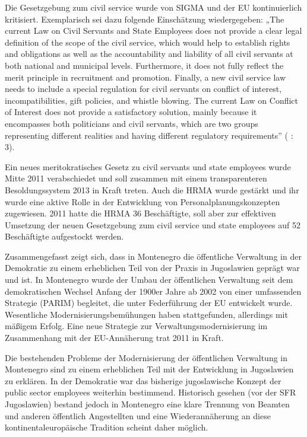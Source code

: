 Die Gesetzgebung zum civil service wurde von SIGMA und der EU kontinuierlich kritisiert. Exemplarisch sei dazu folgende Einschätzung wiedergegeben: „The current Law on Civil Servants and State Employees does not provide a clear legal definition of the scope of the civil service, which would help to establish rights and obligations as well as the accountability and liability of all civil servants at both national and municipal levels. Furthermore, it does not fully reflect the merit principle in recruitment and promotion. Finally, a new civil service law needs to include a special regulation for civil servants on conflict of interest, incompatibilities, gift policies, and whistle blowing. The current Law on Conflict of Interest does not provide a satisfactory solution, mainly because it encompasses both politicians and civil servants, which are two groups representing different realities and having different regulatory requirements” (\cite{oecd10a} : 3).\par
Ein neues meritokratisches Gesetz zu civil servants und state employees wurde Mitte 2011 verabschiedet und soll zusammen mit einem transparenteren Besoldungssystem 2013 in Kraft treten. Auch die HRMA wurde gestärkt und ihr wurde eine aktive Rolle in der Entwicklung von Personalplanungskonzepten zugewiesen. 2011 hatte die HRMA 36 Beschäftigte, soll aber zur effektiven Umsetzung der neuen Gesetzgebung zum civil service und state employees auf 52 Beschäftigte aufgestockt werden.\par
Zusammengefasst zeigt sich, dass in Montenegro die öffentliche Verwaltung in der Demokratie zu einem erheblichen Teil von der Praxis in Jugoslawien geprägt war und ist. In Montenegro wurde der Umbau der öffentlichen Verwaltung seit dem demokratischen Wechsel Anfang der 1900er Jahre ab 2002 von einer umfassenden Strategie (PARIM) begleitet, die unter Federführung der EU entwickelt wurde. Wesentliche Modernisierungsbemühungen haben stattgefunden, allerdings mit mäßigem Erfolg. Eine neue Strategie zur Verwaltungsmodernisierung im Zusammenhang mit der EU-Annäherung trat 2011 in Kraft. \par
Die bestehenden Probleme der Modernisierung der öffentlichen Verwaltung in Montenegro sind zu einem erheblichen Teil mit der Entwicklung in Jugoslawien zu erklären. In der Demokratie war das bisherige jugoslawische Konzept der public sector employees weiterhin bestimmend. Historisch gesehen (vor der SFR Jugoslawien) bestand jedoch in Montenegro eine klare Trennung von Beamten und anderen öffentlich Angestellten und eine Wiederannäherung an diese kontinentaleuropäische Tradition scheint daher möglich. \par
